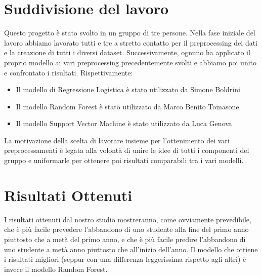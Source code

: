 \documentclass[../Report.tex]{subfiles}
\begin{document}
        \section{Suddivisione del lavoro}
        Questo progetto è stato svolto in un gruppo di tre persone. Nella fase iniziale del lavoro abbiamo lavorato tutti e tre a stretto contatto per il preprocessing dei dati e la creazione di tutti i diversi dataset. Successivamente, ognuno ha applicato il proprio modello ai vari preprocessing precedentemente svolti e abbiamo poi unito e confrontato i risultati. Rispettivamente:
        \begin{itemize}
            \item Il modello di Regressione Logistica è stato utilizzato da Simone Boldrini
            \item Il modello Random Forest è stato utilizzato da Marco Benito Tomasone 
            \item Il modello Support Vector Machine è stato utilizzato da Luca Genova
        \end{itemize}
        La motivazione della scelta di lavorare insieme per l'ottenimento dei vari preprocessamenti è legata alla volontà di unire le idee di tutti i componenti del gruppo e uniformarle per ottenere poi risultati comparabili tra i vari modelli. 
        \section{Risultati Ottenuti}
        I risultati ottenuti dal nostro studio mostreranno, come ovviamente prevedibile, che è più facile prevedere l'abbandono di uno studente alla fine del primo anno piuttosto che a metà del primo anno, e che è più facile predire l'abbandono di uno studente a metà anno piuttosto che all'inizio dell'anno. Il modello che ottiene i risultati migliori (seppur con una differenza leggerissima rispetto agli altri) è invece il modello Random Forest. 
        \dobib
\end{document}
